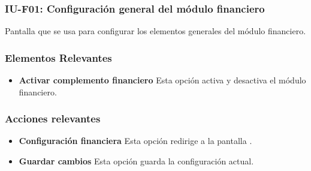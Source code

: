 
\subsubsection{IU-F01: Configuración general del módulo financiero}

 Pantalla que se usa para configurar los elementos generales del módulo financiero.

\subsubsection{Elementos Relevantes}

    \begin{itemize}
        \item {\bf Activar complemento financiero}
            Esta opción activa y desactiva el módulo financiero.
    \end{itemize}

\subsubsection{Acciones relevantes}

    \begin{itemize}
        \item {\bf Configuración financiera}
            Esta opción redirige a la pantalla .
        \item {\bf Guardar cambios}
            Esta opción guarda la configuración actual.
    \end{itemize}

\clearpage

